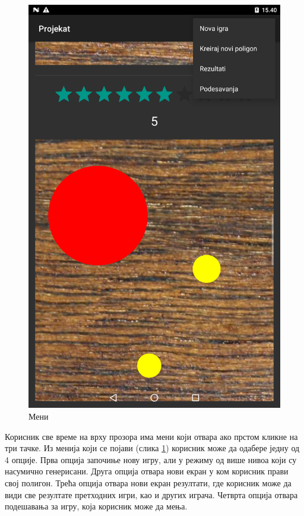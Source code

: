 \begin{figure}[htb!]
\begin{center}
\includegraphics[scale=.1]{pictures/main/Menu}
\caption{Мени}\label{fig:mainMenu}
\end{center}
\end{figure}
Корисник све време на врху прозора има мени који отвара ако прстом кликне на три тачке. Из менија који се појави (слика \ref{fig:mainMenu}) корисник може да одабере једну од 4 опције. Прва опција започиње нову игру, али у режиму од више нивоа који су насумично генерисани. Друга опција отвара нови екран у ком корисник прави свој полигон. Трећа опција отвара нови екран резултати, где корисник може да види све резултате претходних игри, као и других играча. Четврта опција отвара подешавања за игру, која корисник може да мења.


